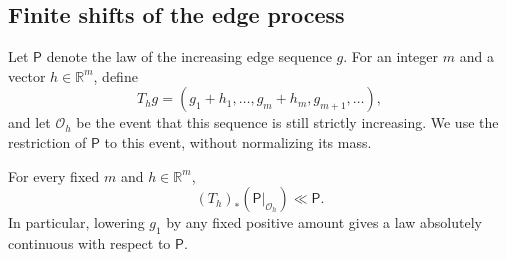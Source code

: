 \subsection{Finite shifts of the edge process}

Let $\mathsf P$ denote the law of the increasing edge sequence $g$.
For an integer $m$ and a vector $h\in\mathbb R^m$, define
\[
 T_hg=(g_1+h_1,\ldots,g_m+h_m,g_{m+1},\ldots),
\]
and let $\mathcal O_h$ be the event that this sequence is still strictly
increasing.  We use the restriction of $\mathsf P$ to this event,
without normalizing its mass.

\begin{lemma}
\label{lem:functional-shift}
For every fixed $m$ and $h\in\mathbb R^m$,
\[
 (T_h)_*(\mathsf P|_{\mathcal O_h})\ll\mathsf P.
\]
In particular, lowering $g_1$ by any fixed positive amount gives a
law absolutely continuous with respect to $\mathsf P$.
\end{lemma}

